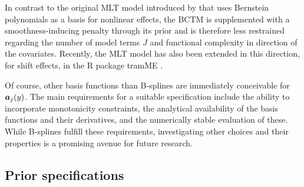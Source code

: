 \documentclass[12pt]{article}
\theoremstyle{plain}
\begin{document}
In contrast to the original MLT model introduced by \cite{hothorn2018} that uses Bernstein polynomials as a basis for nonlinear effects, the BCTM is supplemented with a smoothness-inducing penalty through its prior and is therefore less restrained regarding the number of model terms $J$ and functional complexity in direction of the covariates. Recently, the MLT model has also been extended in this direction, for shift effects, in the R package tramME \citep{tamasi2022tramme}.

Of course, other basis functions than B-splines are immediately conceivable for $\text{\boldmath$a$}_j(y)$. The main requirements for a suitable specification include the ability to incorporate monotonicity constraints, the analytical availability of the basis functions and their derivatives, and the numerically stable evaluation of these. While B-splines fulfill these requirements, investigating other choices and their properties is a promising avenue for future research.

\subsection{Prior specifications}\label{sec:priors}
\end{document}

